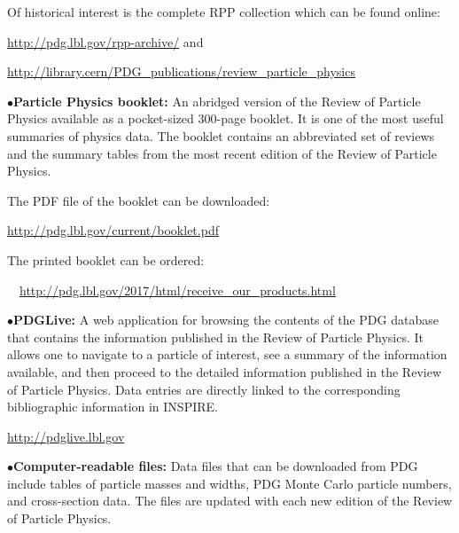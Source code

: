\item{} Of historical interest is the complete RPP collection which can be found online:

         \item{}\quad\url{http://pdg.lbl.gov/rpp-archive/} and
         \item{}\quad\url{http://library.cern/PDG\_publications/review\_particle\_physics}


\item{$\bullet$}{\bf Particle Physics booklet:}
An abridged version of the Review of Particle Physics available as a pocket-sized 
300-page booklet. It is one of the most useful summaries 
of physics data. The booklet contains an abbreviated set of reviews and the summary 
tables from the most recent edition of the Review of Particle Physics.

\item{} The PDF file of the booklet can be downloaded: 

         \item{}\qquad\url{http://pdg.lbl.gov/current/booklet.pdf}

\item{} The printed booklet can be ordered: 

         \item{}~~\url{http://pdg.lbl.gov/2017/html/receive\_our\_products.html}


\medskip

\item{$\bullet$}{\bf PDGLive:}
A web application for browsing the contents of the PDG database that contains the information published in the Review of Particle Physics. It allows one to navigate to a particle of interest, see a summary of the information available, and then proceed to the detailed information published in the Review of Particle Physics. Data entries are directly linked to the corresponding bibliographic information in INSPIRE.

    \item{}\qquad\url{http://pdglive.lbl.gov}


\medskip

\item{$\bullet$}{\bf Computer-readable files:}
Data files that can be downloaded from PDG include tables of particle masses and widths, PDG Monte Carlo particle numbers, and cross-section data. The files are updated with each new edition of the Review of Particle Physics. 

